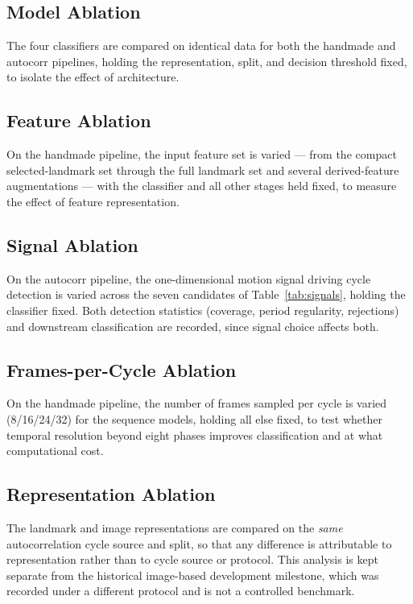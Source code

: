 \subsection{Model Ablation}
\label{sec:abl-model}
The four classifiers are compared on identical data for both the handmade and
autocorr pipelines, holding the representation, split, and decision threshold
fixed, to isolate the effect of architecture.

\subsection{Feature Ablation}
\label{sec:abl-feature}
On the handmade pipeline, the input feature set is varied --- from the compact
selected-landmark set through the full landmark set and several
derived-feature augmentations --- with the classifier and all other stages held
fixed, to measure the effect of feature representation.

\subsection{Signal Ablation}
\label{sec:abl-signal}
On the autocorr pipeline, the one-dimensional motion signal driving cycle
detection is varied across the seven candidates of
Table~\ref{tab:signals}, holding the classifier fixed. Both detection
statistics (coverage, period regularity, rejections) and downstream
classification are recorded, since signal choice affects both.

\subsection{Frames-per-Cycle Ablation}
\label{sec:abl-frames}
On the handmade pipeline, the number of frames sampled per cycle is varied
(8/16/24/32) for the sequence models, holding all else fixed, to test whether
temporal resolution beyond eight phases improves classification and at what
computational cost.

\subsection{Representation Ablation}
\label{sec:abl-representation}
The landmark and image representations are compared on the \emph{same}
autocorrelation cycle source and split, so that any difference is attributable
to representation rather than to cycle source or protocol. This analysis is kept
separate from the historical image-based development milestone, which was
recorded under a different protocol and is not a controlled benchmark.

